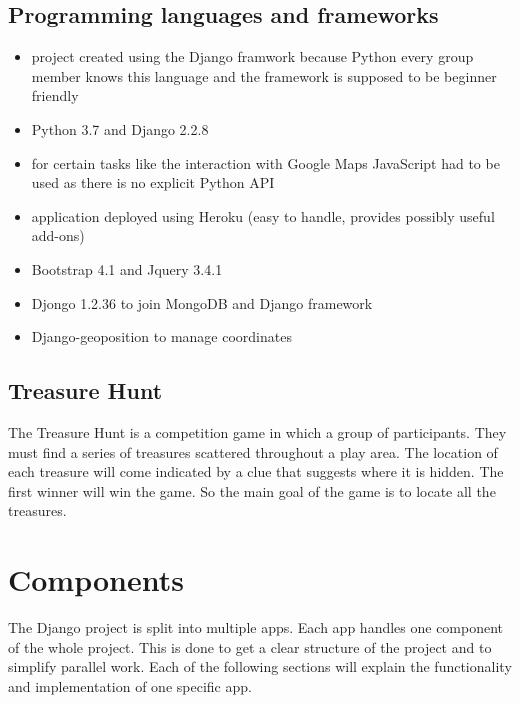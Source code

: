 \documentclass{article}
\begin{document}
\subsection{Programming languages and frameworks}
\begin{itemize}
\item project created using the Django framwork because Python every group member knows this language and the framework is supposed to be beginner friendly
\item Python 3.7 and Django 2.2.8
\item for certain tasks like the interaction with Google Maps JavaScript had to be used as there is no explicit Python API
\item application deployed using Heroku (easy to handle, provides possibly useful add-ons)
\item Bootstrap 4.1 and Jquery 3.4.1
\item Djongo 1.2.36 to join MongoDB and Django framework
\item Django-geoposition to manage coordinates
\end{itemize}


\subsection{Treasure Hunt}

The Treasure Hunt is a competition game in which a group of participants. They must find a series of treasures scattered throughout a play area. The location of each treasure will come indicated by a clue that suggests where it is hidden. The first winner will win the game. So the main goal of the game is to locate all the treasures.

\section{Components} %
The Django project is split into multiple apps. Each app handles one component of the whole project. This is done to get a clear structure of the project and to simplify parallel work. Each of the following sections will explain the functionality and implementation of one specific app.
\end{document}
